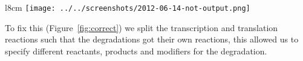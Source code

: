 \begin{wrapfigure}{l}{8cm}
	\centering\texttt{[image: ../../screenshots/2012-06-14-not-output.png]}
	\caption{Correct output, B degrades.}
	\label{fig:correct}
\end{wrapfigure}

To fix this (Figure~\ref{fig:correct}) we split the transcription and translation reactions such that the degradations got their own reactions, this allowed us to specify different reactants, products and modifiers for the degradation.
